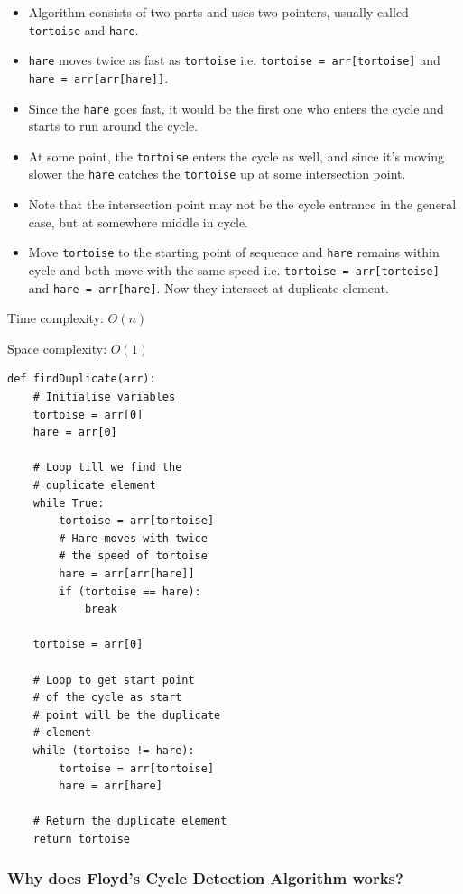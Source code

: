 \documentclass[a4paper,11pt]{book}
\begin{document}
\begin{itemize}

\item Algorithm consists of two parts and uses two pointers, usually called \lstinline{tortoise} and \lstinline{hare}.
\item \lstinline{hare} moves twice as fast as \lstinline{tortoise} i.e. \lstinline{tortoise = arr[tortoise]} and \lstinline{hare = arr[arr[hare]]}.
\item Since the \lstinline{hare} goes fast, it would be the first one who enters the cycle and starts to run around the cycle.
\item At some point, the \lstinline{tortoise} enters the cycle as well, and since it’s moving slower the \lstinline{hare} catches the \lstinline{tortoise} up at some intersection point.
\item Note that the intersection point may not be the cycle entrance in the general case, but at somewhere middle in cycle.
\item Move \lstinline{tortoise} to the starting point of sequence and \lstinline{hare} remains within cycle and both move with the same speed i.e. \lstinline{tortoise = arr[tortoise]} and \lstinline{hare = arr[hare]}. Now they intersect at duplicate element.

\end{itemize}

\noindent Time complexity: $O(n)$

\noindent Space complexity: $O(1)$

\newpage
\begin{lstlisting}
def findDuplicate(arr):
    # Initialise variables
    tortoise = arr[0]
    hare = arr[0]

    # Loop till we find the
    # duplicate element
    while True:
        tortoise = arr[tortoise]
        # Hare moves with twice
        # the speed of tortoise
        hare = arr[arr[hare]]
        if (tortoise == hare):
            break

    tortoise = arr[0]

    # Loop to get start point
    # of the cycle as start
    # point will be the duplicate
    # element
    while (tortoise != hare):
        tortoise = arr[tortoise]
        hare = arr[hare]

    # Return the duplicate element
    return tortoise
\end{lstlisting}

\subsubsection{Why does Floyd's Cycle Detection Algorithm works?}
\end{document}
